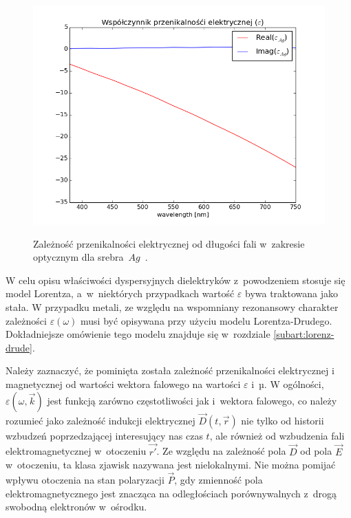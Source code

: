 \begin{figure}[htb]
	\includegraphics[width=\textwidth]{images/agtio2eps.png}
	\label{fig:agtio2eps}
	\caption{Zależność przenikalności elektrycznej od długości fali w~zakresie optycznym dla srebra~$Ag$~\cite{PhysRevB.6.4370}. }  
\end{figure}
W celu opisu właściwości dyspersyjnych dielektryków z~powodzeniem stosuje się model Lorentza, a~w~niektórych przypadkach wartość $\varepsilon$ bywa traktowana jako stała. W przypadku metali, ze względu na wspomniany rezonansowy charakter zależności $\varepsilon(\omega)$  musi być opisywana przy użyciu modelu Lorentza-Drudego. Dokładniejsze omówienie tego modelu znajduje się w~rozdziale \ref{subart:lorenz-drude}.

Należy zaznaczyć, że pominięta została zależność przenikalności elektrycznej i magnetycznej od wartości wektora falowego na wartości $\varepsilon$ i~µ. W ogólności, $\varepsilon(\omega,\vec{k})$ jest funkcją zarówno częstotliwości jak i~wektora falowego, co należy rozumieć jako zależność indukcji elektrycznej $\vec{D}(t,\vec{r})$ nie tylko od historii wzbudzeń poprzedzającej interesujący nas czas $t$, ale również od wzbudzenia fali elektromagnetycznej w~otoczeniu $\vec{r'}$. Ze względu na zależność pola $\vec{D}$ od pola $\vec{E}$ w~otoczeniu, ta klasa zjawisk nazywana jest nielokalnymi. Nie można pomijać wpływu otoczenia na stan polaryzacji $\vec{P}$, gdy zmienność pola elektromagnetycznego jest znacząca na odległościach porównywalnych z~drogą swobodną elektronów w~ośrodku.



